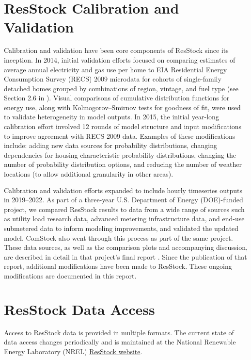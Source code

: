 \section{ResStock Calibration and Validation}
Calibration and validation have been core components of ResStock since its inception. In 2014, initial validation efforts focused on comparing estimates of average annual electricity and gas use per home to EIA Residential Energy Consumption Survey (RECS) 2009 microdata for cohorts of single-family detached homes grouped by combinations of region, vintage, and fuel type (see Section 2.6 in \cite{Wilson2017}). Visual comparisons of cumulative distribution functions for energy use, along with Kolmogorov–Smirnov tests for goodness of fit, were used to validate heterogeneity in model outputs. In 2015, the initial year-long calibration effort involved 12 rounds of model structure and input modifications to improve agreement with RECS 2009 data. Examples of these modifications include: adding new data sources for probability distributions, changing dependencies for housing characteristic probability distributions, changing the number of probability distribution options, and reducing the number of weather locations (to allow additional granularity in other areas). 

Calibration and validation efforts expanded to include hourly timeseries outputs in 2019--2022. As part of a three-year U.S. Department of Energy (DOE)-funded project, we compared ResStock results to data from a wide range of sources such as utility load research data, advanced metering infrastructure data, and end-use submetered data to inform modeling improvements, and validated the updated model. ComStock also went through this process as part of the same project. These data sources, as well as the comparison plots and accompanying discussion, are described in detail in that project’s final report \citep{Wilson2022}. Since the publication of that report, additional modifications have been made to ResStock. These ongoing modifications are documented in this report.


\section{ResStock Data Access}

Access to ResStock data is provided in multiple formats. The current state of data access changes periodically and is maintained at the National Renewable Energy Laboratory (NREL) \href{https://resstock.nrel.gov/datasets}{ResStock website}.



